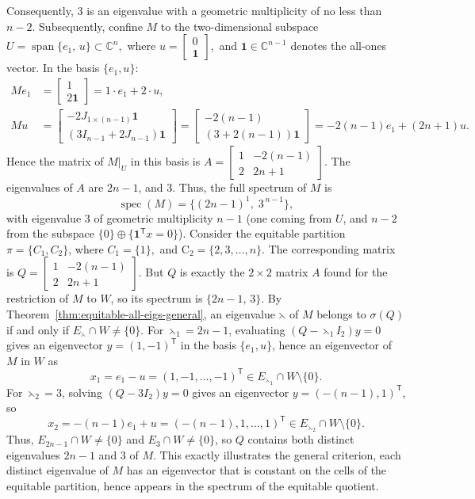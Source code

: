 \documentclass[12pt,twoside]{article}
\begin{document}
	Consequently, $3$ is an eigenvalue with a geometric multiplicity of no less than $n-2$. Subsequently, confine $M$ to the two-dimensional subspace $U =\operatorname{span}\{e_1,\,u\}\subset\mathbb{C}^n,$ where $u  = \begin{bmatrix}0\\ \mathbf{1}\end{bmatrix},$ and $\mathbf{1}\in\mathbb{C}^{n-1}$ denotes the all-ones vector.  In the basis $\{e_1,u\}$:
	\begin{align*}
		M e_1
		&=
		\begin{bmatrix}
			1\\
			2\mathbf{1}
		\end{bmatrix}
		=1\cdot e_1 + 2\cdot u,\\
		M u
		&=
		\begin{bmatrix}
			-2J_{1\times (n-1)}\mathbf{1}\\
			(3I_{n-1}+2J_{n-1})\mathbf{1}
		\end{bmatrix}
		=
		\begin{bmatrix}
			-2(n-1)\\
			(3+2(n-1))\mathbf{1}
		\end{bmatrix}
		=
		-2(n-1)e_1 + (2n+1)u.
	\end{align*}
	Hence the matrix of $M|_U$ in this basis is $A=
	\begin{bmatrix}
		1 & -2(n-1)\\
		2 & 2n+1
	\end{bmatrix}.$ 	The   eigenvalues of $A$ are $2n-1$, and $3.$ Thus, the full spectrum of $M$ is
	$$
	\operatorname{spec}(M)=\{(2n-1)^1,\;3^{\,n-1}\},
	$$
	with eigenvalue $3$ of geometric multiplicity $n-1$ (one coming from $U$, and
	$n-2$ from the subspace $\{0\}\oplus\{\mathbf{1}^\mathsf{T}x=0\}$). Consider the equitable partition $\pi=\{C_{1},C_{2}\}$, where $C_1=\{1\},$ and  C$_2=\{2,3,\dots,n\}.$ The corresponding matrix is  $	Q=
	\begin{bmatrix}
		1 & -2(n-1)\\
		2 & 2n+1
	\end{bmatrix}.$ But $Q$ is exactly the $2\times 2$ matrix $A$ found for the restriction of $M$
	to $W$, so its spectrum is $\{2n-1,\,3\}.$ By Theorem~\ref{thm:equitable-all-eigs-general}, an eigenvalue $\leftthreetimes$ of $M$
	belongs to $\sigma(Q)$ if and only if $E_\leftthreetimes\cap W\neq\{0\}.$  For $\leftthreetimes_1 = 2n-1$, evaluating $(Q-\leftthreetimes_1 I_2)y=0$ gives an eigenvector $y=(1,-1)^\mathsf{T}$ in the basis $\{e_1,u\}$, hence an
		eigenvector of $M$ in $W$ as
		$$
		x_1 = e_1 - u = (1,-1,\dots,-1)^\mathsf{T}\in E_{\leftthreetimes_1}\cap W\setminus\{0\}.
		$$
		For $\leftthreetimes_2 = 3$, solving $(Q-3I_2)y=0$ gives an eigenvector
		$y=(-(n-1),1)^\mathsf{T}$, so
		$$
		x_2 = -(n-1)e_1 + u = (-(n-1),1,\dots,1)^\mathsf{T}\in E_{\leftthreetimes_2}\cap W\setminus\{0\}.
		$$
	Thus, $E_{2n-1}\cap W\neq\{0\}$ and $E_3\cap W\neq\{0\}$, so $Q$ contains both
	distinct eigenvalues $2n-1$ and $3$ of $M$. This exactly illustrates the
	general criterion, each distinct eigenvalue of $M$ has an eigenvector that is
	constant on the cells of the equitable partition, hence appears in the
	spectrum of the equitable quotient.
\end{document}
